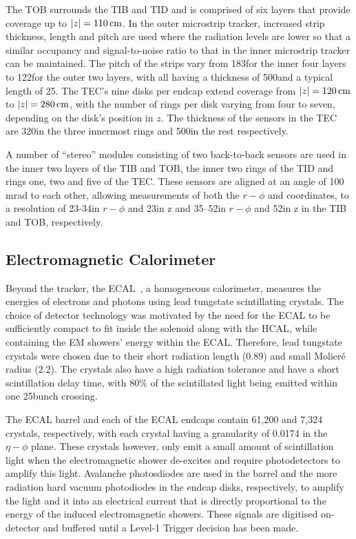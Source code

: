 The TOB surrounds the TIB and TID and is comprised of six layers that provide coverage up to $|z| = 110\,\text{cm}$.
In the outer microstrip tracker, increased strip thickness, length and pitch are used where the radiation levels are lower so that a similar occupancy and signal-to-noise ratio to that in the inner microstrip tracker can be maintained.
The pitch of the strips vary from 183\mum for the inner four layers to 122\mum for the outer two layers, with all having a thickness of 500\mum and a typical length of 25\cm. 
The TEC's nine disks per endcap extend coverage from $|z| = 120\,\text{cm}$ to $|z| = 280\,\text{cm}$, with the number of rings per disk varying from four to seven, depending on the disk's position in $z$.
The thickness of the sensors in the TEC are 320\mum in the three innermost rings and 500\mum in the rest respectively.

A number of ``stereo'' modules consisting of two back-to-back sensors are used in the inner two layers of the TIB and TOB, the inner two rings of the TID and rings one, two and five of the TEC.
These sensors are aligned at an angle of 100 mrad to each other, allowing measurements of both the $r-\phi$ and \rz coordinates, to a resolution of 23-34\mum in $r-\phi$ and 23\mum in z and 35–52\mum in $r-\phi$ and 52\mum in z in the TIB and TOB, respectively.

\subsection{Electromagnetic Calorimeter}\label{subsec:ECAL}
Beyond the tracker, the ECAL~\cite{CMS:1997ysd,CMS:2002xia}, a homogeneous calorimeter, measures the energies of electrons and photons using lead tungstate scintillating crystals.
The choice of detector technology was motivated by the need for the ECAL to be sufficiently compact to fit inside the solenoid along with the HCAL, while containing the EM showers' energy within the ECAL.
Therefore, lead tungstate crystals were chosen due to their short radiation length (0.89\cm) and small Molier\'{e} radius (2.2\cm).
The crystals also have a high radiation tolerance and have a short scintillation delay time, with 80\% of the scintillated light being emitted within one 25\ns bunch crossing.

The ECAL barrel and each of the ECAL endcaps contain 61,200 and 7,324 crystals, respectively, with each crystal having a granularity of 0.0174 in the $\eta - \phi$ plane.
These crystals however, only emit a small amount of scintillation light when the electromagnetic shower de-excites and require photodetectors to amplify this light.
Avalanche photosdiodes are used in the barrel and the more radiation hard vacuum photodiodes in the endcap disks, respectively, to amplify the light and it into an electrical current that is directly proportional to the energy of the induced electromagnetic showers.
These signals are digitised on-detector and buffered until a Level-1 Trigger decision has been made.

